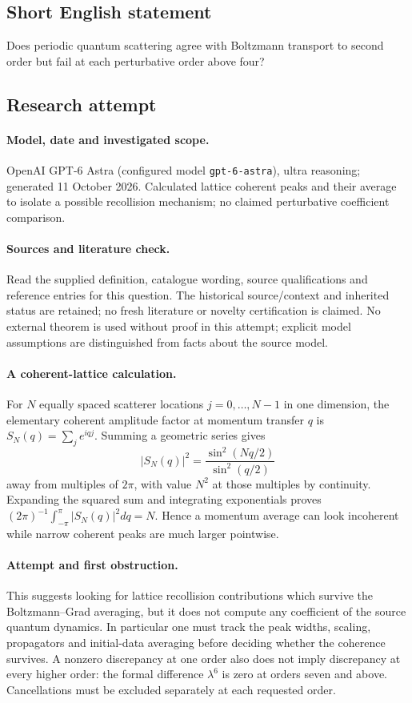\documentclass[11pt]{article}
\begin{document}
\subsection{Short English statement}
Does periodic quantum scattering agree with Boltzmann transport to second order but fail at each perturbative order above four?
\subsection{Research attempt}
\paragraph{Model, date and investigated scope.}
OpenAI GPT-6 Astra (configured model \texttt{gpt-6-astra}), ultra reasoning; generated 11 October 2026. Calculated lattice coherent peaks and their average to isolate a possible recollision mechanism; no claimed perturbative coefficient comparison.

\paragraph{Sources and literature check.}
Read the supplied definition, catalogue wording, source qualifications and reference entries for this question. The historical source/context and inherited status are retained; no fresh literature or novelty certification is claimed. No external theorem is used without proof in this attempt; explicit model assumptions are distinguished from facts about the source model.

\paragraph{A coherent-lattice calculation.} For \(N\) equally spaced scatterer locations \(j=0,\ldots,N-1\) in one dimension, the elementary coherent amplitude factor at momentum transfer \(q\) is \(S_N(q)=\sum_j e^{iqj}\). Summing a geometric series gives
\[
 |S_N(q)|^2=\frac{\sin^2(Nq/2)}{\sin^2(q/2)}
\]
away from multiples of \(2\pi\), with value \(N^2\) at those multiples by continuity. Expanding the squared sum and integrating exponentials proves \((2\pi)^{-1}\int_{-\pi}^{\pi}|S_N(q)|^2dq=N\). Hence a momentum average can look incoherent while narrow coherent peaks are much larger pointwise.
\paragraph{Attempt and first obstruction.} This suggests looking for lattice recollision contributions which survive the Boltzmann--Grad averaging, but it does not compute any coefficient of the source quantum dynamics. In particular one must track the peak widths, scaling, propagators and initial-data averaging before deciding whether the coherence survives. A nonzero discrepancy at one order also does not imply discrepancy at every higher order: the formal difference \(\lambda^6\) is zero at orders seven and above. Cancellations must be excluded separately at each requested order.
\end{document}
